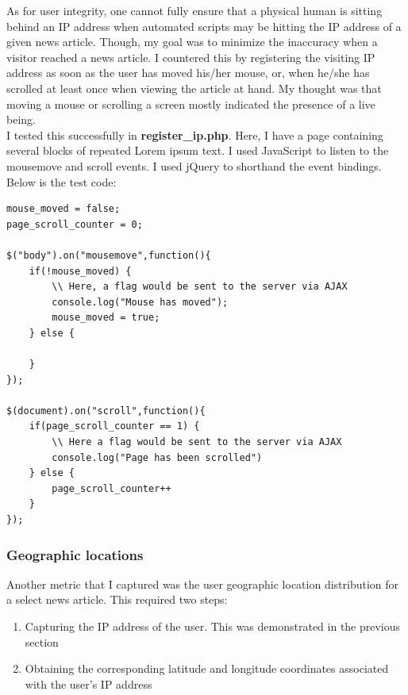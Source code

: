 \documentclass[12pt]{article}
\begin{document}
As for user integrity, one cannot fully ensure that a physical human is sitting behind an IP address when automated scripts may be hitting the IP address of a given news article. Though, my goal was to minimize the inaccuracy when a visitor reached a news article. I countered this by registering the visiting IP address as soon as the user has moved his/her mouse, or, when he/she has scrolled at least once when viewing the article at hand. My thought was that moving a mouse or scrolling a screen mostly indicated the presence of a live being. \\ 
I tested this successfully in \textbf{register\_ip.php}. Here, I have a page containing several blocks of repeated Lorem ipsum text. I used JavaScript to listen to the mousemove and scroll events. I used jQuery to shorthand the event bindings. Below is the test code:
\begin{lstlisting}[basicstyle=\scriptsize]
mouse_moved = false;
page_scroll_counter = 0;

$("body").on("mousemove",function(){
	if(!mouse_moved) {
		\\ Here, a flag would be sent to the server via AJAX
		console.log("Mouse has moved");
		mouse_moved = true;
	} else {
		
	}
});

$(document).on("scroll",function(){
	if(page_scroll_counter == 1) {
		\\ Here a flag would be sent to the server via AJAX
		console.log("Page has been scrolled")
	} else {
		page_scroll_counter++
	}
});
\end{lstlisting}        

\newpage

\subsubsection{Geographic locations}
Another metric that I captured was the user geographic location distribution for a select news article. This required two steps:
\begin{enumerate}
\item Capturing the IP address of the user. This was demonstrated in the previous section
\item Obtaining the corresponding latitude and longitude coordinates associated with the user's IP address
\end{enumerate}
\end{document}
